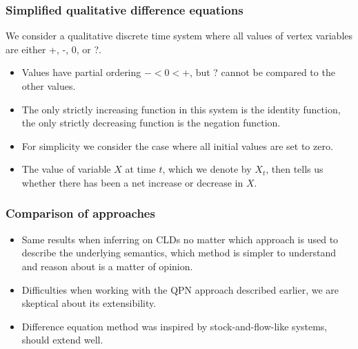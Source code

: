 \documentclass{beamer}
\begin{document}
\begin{frame}
\frametitle{Simplified qualitative difference equations}
We consider a qualitative discrete time system where all values of
vertex variables are either +, -, 0, or ?.
\begin{itemize}
\item Values have partial ordering $- < 0 < +$, but ? cannot be
compared to the other values.

\item The only strictly increasing function in this system is the identity
function, the only strictly decreasing function is the
negation function.

\item For simplicity we consider the case where all initial values are set
to zero.

\item The value of variable $X$ at time $t$, which we denote by $X_t$, then
tells us whether there has been a net increase or decrease in $X$.
\end{itemize}

\end{frame}
\begin{frame}
\frametitle{Comparison of approaches}
\begin{itemize}
\item Same results when inferring on CLDs no matter which approach is used to
describe the underlying semantics, which method is simpler to understand and reason about is a matter of
opinion.
\item Difficulties when working with the
QPN approach described earlier, we are skeptical about its extensibility.

\item Difference equation method was inspired by stock-and-flow-like systems,
  should extend well.
\end{itemize}
\end{frame}
\end{document}
